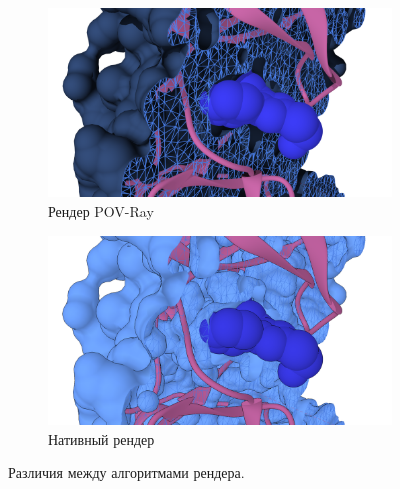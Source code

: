 \begin{figure}
\begin{subfigure}{\linewidth}
    \centering
    \includegraphics[width=\linewidth]{Figures/POV-render.png}
    \caption{Рендер POV-Ray}
    \label{fig:pov}
    \vspace{1em}
\end{subfigure}
\begin{subfigure}{\linewidth}
    \centering
    \includegraphics[width=\linewidth]{Figures/Chimera-render.png}
    \caption{Нативный рендер}
    \label{fig:chi}
\end{subfigure}
\caption{Различия между алгоритмами рендера.}
\label{fig:render}
\end{figure}\clearpage
